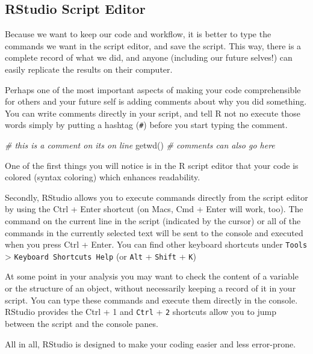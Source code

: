 \documentclass[
]{book}
\newenvironment{Shaded}{\begin{snugshade}}{\end{snugshade}}
\newcommand{\CommentTok}[1]{\textcolor[rgb]{0.56,0.35,0.01}{\textit{#1}}}
\newcommand{\FunctionTok}[1]{\textcolor[rgb]{0.00,0.00,0.00}{#1}}
\newcommand{\NormalTok}[1]{#1}
\begin{document}
\hypertarget{rstudio-script-editor}{%
\subsection{RStudio Script Editor}\label{rstudio-script-editor}}

Because we want to keep our code and workflow, it is better to type the
commands we want in the script editor, and save the script. This way,
there is a complete record of what we did, and anyone (including our
future selves!) can easily replicate the results on their computer.

Perhaps one of the most important aspects of making your code
comprehensible for others and your future self is adding comments about
why you did something. You can write comments directly in your script,
and tell R not no execute those words simply by putting a hashtag (\texttt{\#})
before you start typing the comment.

\begin{Shaded}
\begin{Highlighting}[]
\CommentTok{\# this is a comment on its on line}
\FunctionTok{getwd}\NormalTok{() }\CommentTok{\# comments can also go here}
\end{Highlighting}
\end{Shaded}

One of the first things you will notice is in the R script editor that
your code is colored (syntax coloring) which enhances readability.

Secondly, RStudio allows you to execute commands directly from the
script editor by using the Ctrl + Enter shortcut (on Macs,
Cmd + Enter will work, too). The command on the current line
in the script (indicated by the cursor) or all of the commands in the
currently selected text will be sent to the console and executed when
you press Ctrl + Enter. You can find other keyboard shortcuts
under \texttt{Tools} \textgreater{} \texttt{Keyboard\ Shortcuts\ Help} (or \texttt{Alt} +
\texttt{Shift} + \texttt{K})

At some point in your analysis you may want to check the content of a
variable or the structure of an object, without necessarily keeping a
record of it in your script. You can type these commands and execute
them directly in the console. RStudio provides the Ctrl + 1
and \texttt{Ctrl} + \texttt{2} shortcuts allow you to jump
between the script and the console panes.

All in all, RStudio is designed to make your coding easier and less
error-prone.
\end{document}
